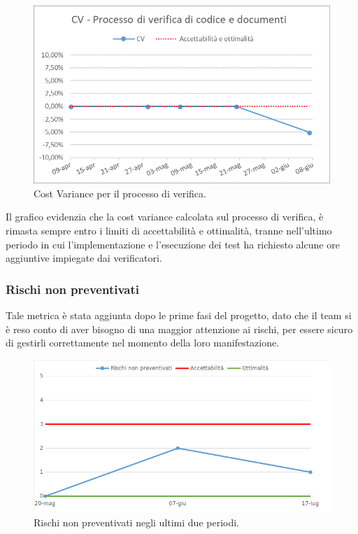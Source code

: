 \begin{figure}[h!]
	\centering
	\includegraphics[scale=0.75]{img/Grafici/CV-verifica.png}
	\caption{Cost Variance per il processo di verifica.}
	\label{fig:CV-VerDocumenti}
\end{figure}

Il grafico evidenzia che la cost variance calcolata sul processo di verifica, è rimasta sempre entro i limiti di accettabilità e ottimalità, tranne nell'ultimo periodo in cui l'implementazione e l'esecuzione dei test ha richiesto alcune ore aggiuntive impiegate dai verificatori.

\newpage

\subsubsection{Rischi non preventivati}

Tale metrica è stata aggiunta dopo le prime fasi del progetto, dato che il team si è reso conto di aver bisogno di una maggior attenzione ai rischi, per essere sicuro di gestirli correttamente nel momento della loro manifestazione.

\begin{figure}[h!]
	\centering
	\includegraphics[scale=0.75]{img/Grafici/Rischi.png}
	\caption{Rischi non preventivati negli ultimi due periodi.}
	\label{fig:Rischi}
\end{figure}

